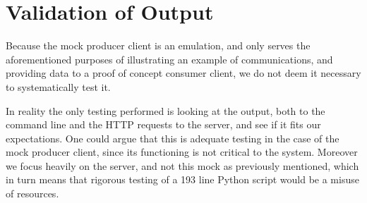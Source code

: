 \section{Validation of Output}
Because the mock producer client is an emulation, and only serves the aforementioned purposes of illustrating an example of communications, and providing data to a proof of concept consumer client,
we do not deem it necessary to systematically test it.

In reality the only testing performed is looking at the output, both to the command line and the HTTP requests to the server, and see if it fits our expectations.
One could argue that this is adequate testing in the case of the mock producer client, since its functioning is not critical to the system.
Moreover we focus heavily on the server, and not this mock as previously mentioned, which in turn means that rigorous testing of a 193 line Python script would be a misuse of resources.
